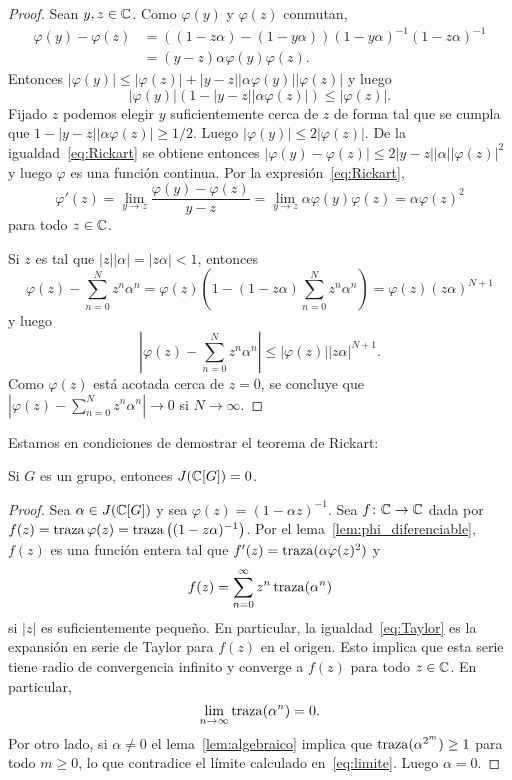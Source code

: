 \begin{exercise}
\begin{proof}	
	Sean $y,z\in\mathbb{C}$. Como $\varphi(y)$ y $\varphi(z)$ conmutan, 
	\begin{equation}
		\label{eq:Rickart}
		\begin{aligned}
			\varphi(y)-\varphi(z)&=\left( (1-z\alpha)-(1-y\alpha)\right)(1-y\alpha)^{-1}(1-z\alpha)^{-1}\\
			&=(y-z)\alpha\varphi(y)\varphi(z).
		\end{aligned}
	\end{equation}
	Entonces $|\varphi(y)|\leq|\varphi(z)|+|y-z||\alpha\varphi(y)||\varphi(z)|$ y luego
	\[
		|\varphi(y)|\left( 1-|y-z||\alpha\varphi(z)|\right)\leq|\varphi(z)|.
	\]
	Fijado $z$ podemos elegir $y$ suficientemente cerca de $z$ de forma tal que
	se cumpla que  $1-|y-z||\alpha\varphi(z)|\geq1/2$. Luego
	$|\varphi(y)|\leq2|\varphi(z)|$. De la igualdad~\eqref{eq:Rickart} se
	obtiene entonces $|\varphi(y)-\varphi(z)|\leq2|y-z||\alpha||\varphi(z)|^2$
	y luego $\varphi$ es una función continua. Por la
	expresión~\eqref{eq:Rickart}, 
	\[
	\varphi'(z)
	=\lim_{y\to z}\frac{\varphi(y)-\varphi(z)}{y-z}
	=\lim_{y\to z}\alpha\varphi(y)\varphi(z)
	=\alpha\varphi(z)^2
	\]
	para todo $z\in\mathbb{C}$.

	Si $z$ es tal que $|z||\alpha|=|z\alpha|<1$, entonces 
	\[
		\varphi(z)-\sum_{n=0}^Nz^n\alpha^n
		=\varphi(z)\left(1-(1-z\alpha)\sum_{n=0}^Nz^n\alpha^n\right)
		=\varphi(z)(z\alpha)^{N+1}
	\]
	y luego
	\[
		\left|\varphi(z)-\sum_{n=0}^Nz^n\alpha^n\right|\leq|\varphi(z)||z\alpha|^{N+1}.
	\]
	Como $\varphi(z)$ está acotada cerca de $z=0$, se concluye que
	$\left|\varphi(z)-\sum_{n=0}^Nz^n\alpha^n\right|\to0$ si $N\to\infty$.
\end{proof}

Estamos en condiciones de demostrar el teorema de Rickart:

\begin{theorem}[Rickart]
	Si $G$ es un grupo, entonces $J(\mathbb{C}[G])=0$.
\end{theorem}

\begin{proof}
	Sea $\alpha\in J(\mathbb{C}[G])$ y sea $\varphi(z)=(1-\alpha z)^{-1}$. Sea 
	$f\colon\mathbb{C}\to \mathbb{C}$ dada por
	$f(z)=\operatorname{traza}\varphi(z)=\operatorname{traza}\left((1-z\alpha)^{-1}\right)$. Por el lema~\ref{lem:phi_diferenciable},
	$f(z)$ es una función entera tal que $f'(z)=\operatorname{traza}(\alpha\varphi(z)^2)$ y
	\begin{equation}
		\label{eq:Taylor}
		f(z)=\sum_{n=0}^\infty z^n\operatorname{traza}(\alpha^n)
	\end{equation}
	si $|z|$ es suficientemente pequeño. En particular, la
	igualdad~\eqref{eq:Taylor} es la expansión en serie de Taylor para $f(z)$
	en el origen. Esto implica que esta serie tiene radio de convergencia
	infinito y converge a $f(z)$ para todo $z\in\mathbb{C}$. En particular,
	\begin{equation}
		\label{eq:limite}
		\lim_{n\to\infty}\operatorname{traza}(\alpha^n)=0.
	\end{equation}
	Por otro lado, si $\alpha\ne0$ el lema~\ref{lem:algebraico} implica que
	$\operatorname{traza}(\alpha^{2^m})\geq1$ para todo $m\geq0$, lo que contradice el límite
	calculado en~\eqref{eq:limite}. Luego $\alpha=0$.
\end{proof}


\end{exercise}
